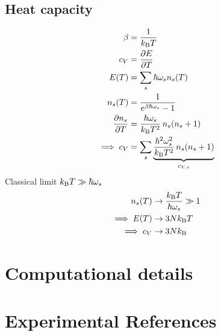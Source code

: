 \section{Heat capacity}
\begin{subequations}
\begin{align}
	\beta
		& = \frac{1}{k_{\rm B} T} \\
	c_V 
		&= \frac{\partial E}{\partial T} \\
	E (T)
		&= \sum_s \hbar \omega_s n_s (T) \\
	n_s (T)
		&= \frac{1}{e^{\beta \hbar \omega_s} - 1} \\
	\frac{\partial n_s}{\partial T}
		&= \frac{\hbar \omega_s}{k_{\rm B} T^2} \, n_s (n_s + 1) \\
	\implies c_V
		&= \sum_s \underset{c_{V, s}}{\underbrace{\frac{\hbar^2 \omega_s^2}{k_{\rm B} T^2} \, n_s (n_s + 1)}}
\end{align}
\end{subequations}
Classical limit $k_{\rm B} T \gg \hbar \omega_s$
\begin{subequations}
\begin{align}
	n_s (T) 
		&\to \frac{k_{\rm B} T}{\hbar \omega_s} \gg 1 \\
	\implies E(T)
		&\to 3 N k_{\rm B} T \\
	\implies c_V 
		&\to 3 N k_{\rm B}
\end{align}
\end{subequations}




\chapter{Computational details}
\label{sec:app.computational_details}

\chapter{Experimental References}
\label{sec:app.experiments}

